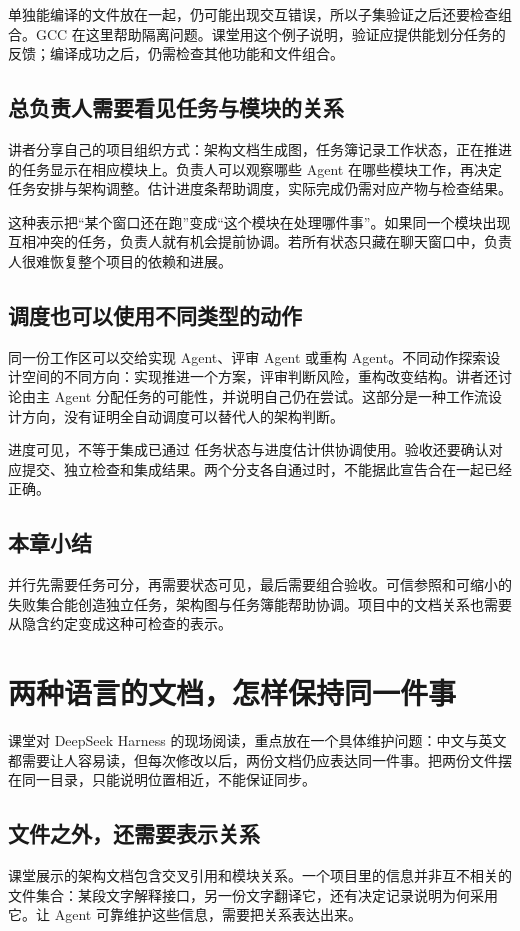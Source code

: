 \documentclass[a4paper]{article}
\begin{document}
单独能编译的文件放在一起，仍可能出现交互错误，所以子集验证之后还要检查组合。GCC 在这里帮助隔离问题。课堂用这个例子说明，验证应提供能划分任务的反馈；编译成功之后，仍需检查其他功能和文件组合。

\subsection{总负责人需要看见任务与模块的关系}
讲者分享自己的项目组织方式：架构文档生成图，任务簿记录工作状态，正在推进的任务显示在相应模块上。负责人可以观察哪些 Agent 在哪些模块工作，再决定任务安排与架构调整。估计进度条帮助调度，实际完成仍需对应产物与检查结果。

这种表示把“某个窗口还在跑”变成“这个模块在处理哪件事”。如果同一个模块出现互相冲突的任务，负责人就有机会提前协调。若所有状态只藏在聊天窗口中，负责人很难恢复整个项目的依赖和进展。

\subsection{调度也可以使用不同类型的动作}
同一份工作区可以交给实现 Agent、评审 Agent 或重构 Agent。不同动作探索设计空间的不同方向：实现推进一个方案，评审判断风险，重构改变结构。讲者还讨论由主 Agent 分配任务的可能性，并说明自己仍在尝试。这部分是一种工作流设计方向，没有证明全自动调度可以替代人的架构判断。

\begin{warningbox}{进度可见，不等于集成已通过}
任务状态与进度估计供协调使用。验收还要确认对应提交、独立检查和集成结果。两个分支各自通过时，不能据此宣告合在一起已经正确。
\end{warningbox}

\subsection{本章小结}
并行先需要任务可分，再需要状态可见，最后需要组合验收。可信参照和可缩小的失败集合能创造独立任务，架构图与任务簿能帮助协调。项目中的文档关系也需要从隐含约定变成这种可检查的表示。

\section{两种语言的文档，怎样保持同一件事}
\label{sec:bilingual}
课堂对 DeepSeek Harness 的现场阅读，重点放在一个具体维护问题：中文与英文都需要让人容易读，但每次修改以后，两份文档仍应表达同一件事。把两份文件摆在同一目录，只能说明位置相近，不能保证同步。

\subsection{文件之外，还需要表示关系}
课堂展示的架构文档包含交叉引用和模块关系。一个项目里的信息并非互不相关的文件集合：某段文字解释接口，另一份文字翻译它，还有决定记录说明为何采用它。让 Agent 可靠维护这些信息，需要把关系表达出来。
\end{document}
